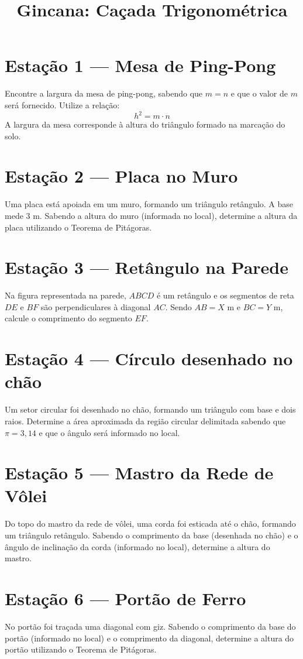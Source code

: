\documentclass[12pt]{article}
\title{Gincana: Caçada Trigonométrica}
\date{}
\begin{document}
	
	\maketitle
	
	\section*{Estação 1 — Mesa de Ping-Pong}
	Encontre a largura da mesa de ping-pong, sabendo que $m = n$ e que o valor de $m$ será fornecido. Utilize a relação:
	\[
	h^2 = m \cdot n
	\]
	A largura da mesa corresponde à altura do triângulo formado na marcação do solo.
	
	\section*{Estação 2 — Placa no Muro}
	Uma placa está apoiada em um muro, formando um triângulo retângulo. A base mede 3 m. Sabendo a altura do muro (informada no local), determine a altura da placa utilizando o Teorema de Pitágoras.
	
	\section*{Estação 3 — Retângulo na Parede}
	Na figura representada na parede, $ABCD$ é um retângulo e os segmentos de reta $DE$ e $BF$ são perpendiculares à diagonal $AC$. Sendo $AB = X$ m e $BC = Y$ m, calcule o comprimento do segmento $EF$.
	
	\section*{Estação 4 — Círculo desenhado no chão}
	Um setor circular foi desenhado no chão, formando um triângulo com base e dois raios. Determine a área aproximada da região circular delimitada sabendo que $\pi = 3{,}14$ e que o ângulo será informado no local.
	
	\section*{Estação 5 — Mastro da Rede de Vôlei}
	Do topo do mastro da rede de vôlei, uma corda foi esticada até o chão, formando um triângulo retângulo. Sabendo o comprimento da base (desenhada no chão) e o ângulo de inclinação da corda (informado no local), determine a altura do mastro.
	
	\section*{Estação 6 — Portão de Ferro}
	No portão foi traçada uma diagonal com giz. Sabendo o comprimento da base do portão (informado no local) e o comprimento da diagonal, determine a altura do portão utilizando o Teorema de Pitágoras.
	
\end{document}
